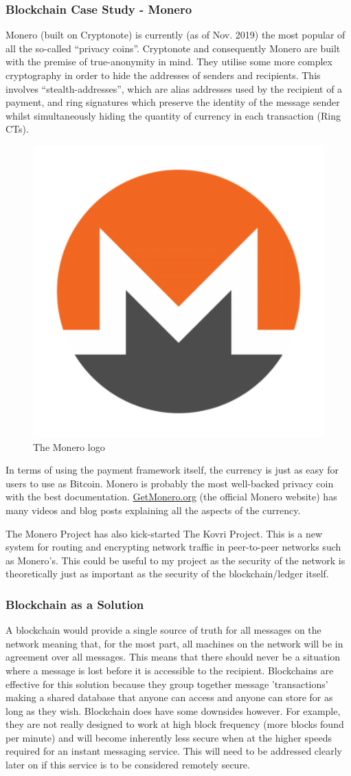 \documentclass{article}
\begin{document}
\subsubsection{Blockchain Case Study - Monero}
Monero (built on Cryptonote\cite{cryptonote_paper}) is currently (as of Nov. 2019) the most popular of all the so-called ``privacy coins''. Cryptonote and consequently Monero are built with the premise of true-anonymity in mind. They utilise some more complex cryptography in order to hide the addresses of senders and recipients. This involves ``stealth-addresses'', which are alias addresses used by the recipient of a payment, and ring signatures which preserve the identity of the message sender whilst simultaneously hiding the quantity of currency in each transaction (Ring CTs).
\begin{figure}[h]
    \centering
    \includegraphics[width=0.4\linewidth]{Images/monerologo.png}
    \caption{The Monero logo}
    \label{fig:monerologo}
\end{figure}
In terms of using the payment framework itself, the currency is just as easy for users to use as Bitcoin. Monero is probably the most well-backed privacy coin with the best documentation. \url{GetMonero.org} (the official Monero website) has many videos and blog posts explaining all the aspects of the currency. 

The Monero Project has also kick-started The Kovri Project\cite{kovri_repo}. This is a new system for routing and encrypting network traffic in peer-to-peer networks such as Monero's. This could be useful to my project as the security of the network is theoretically just as important as the security of the blockchain/ledger itself.


\subsubsection{Blockchain as a Solution}
A blockchain would provide a single source of truth for all messages on the network meaning that, for the most part, all machines on the network will be in agreement over all messages. This means that there should never be a situation where a message is lost before it is accessible to the recipient. Blockchains are effective for this solution because they group together message 'transactions' making a shared database that anyone can access and anyone can store for as long as they wish. Blockchain does have some downsides however. For example, they are not really designed to work at high block frequency (more blocks found per minute) and will become inherently less secure when at the higher speeds required for an instant messaging service. This will need to be addressed clearly later on if this service is to be considered remotely secure.
\end{document}

